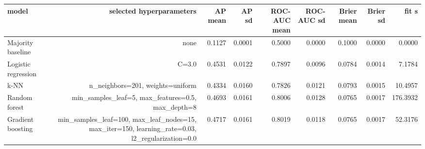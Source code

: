 \begin{tabular}{lrrrrrrrr}
\toprule
model & selected hyperparameters & AP mean & AP sd & ROC-AUC mean & ROC-AUC sd & Brier mean & Brier sd & fit s \\
\midrule
Majority baseline & none & 0.1127 & 0.0001 & 0.5000 & 0.0000 & 0.1000 & 0.0000 & 0.0000 \\
Logistic regression & C=3.0 & 0.4531 & 0.0122 & 0.7897 & 0.0096 & 0.0784 & 0.0014 & 7.1784 \\
k-NN & n\_neighbors=201, weights=uniform & 0.4334 & 0.0160 & 0.7826 & 0.0121 & 0.0793 & 0.0015 & 10.4957 \\
Random forest & min\_samples\_leaf=5, max\_features=0.5, max\_depth=8 & 0.4693 & 0.0161 & 0.8006 & 0.0128 & 0.0765 & 0.0017 & 176.3932 \\
Gradient boosting & min\_samples\_leaf=100, max\_leaf\_nodes=15, max\_iter=150, learning\_rate=0.03, l2\_regularization=0.0 & 0.4717 & 0.0161 & 0.8019 & 0.0118 & 0.0765 & 0.0017 & 52.3176 \\
\bottomrule
\end{tabular}